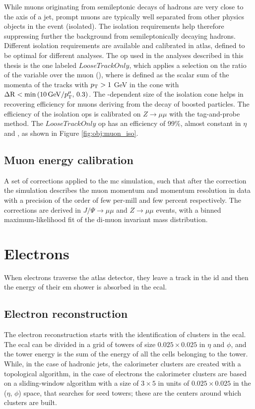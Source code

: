 While muons originating from semileptonic decays of hadrons are very close to the axis of a jet, prompt muons are typically well separated from other physics objects in the event (isolated). The isolation requirements help therefore suppressing further the background from semileptonically decaying hadrons. Different isolation requirements are available and calibrated in \gls{atlas}, defined to be optimal for different analyses. 
The \gls{op} used in the analyses described in this thesis is the one labeled $LooseTrackOnly$, which applies a selection on the ratio of the 
variable \ptvar over the muon \pt (\ptmu), where \ptvar is defined as the scalar sum of the momenta of the tracks with $p_{\rm T}>1$ GeV in the cone with 
$\Delta\mathrm{R} < \min \left(  10 \, \mathrm{GeV}/p_\mathrm{T}^\mu , \, 0.3\right) $. The \pt-dependent size of the isolation cone helps in recovering efficiency for muons deriving from the decay of boosted particles. The efficiency of the isolation \glspl{op} is calibrated on $Z\rightarrow \mu \mu$ with the tag-and-probe method. The $LooseTrackOnly$ \gls{op} has an efficiency of 99\%, almost constant in $\eta$ and \pt, as shown in Figure \ref{fig:obj:muon_iso}. 

\subsection{Muon energy calibration}
A set of corrections applied to the \gls{mc} simulation, such that after the correction the simulation describes the muon momentum and momentum resolution in data with a precision of the order of few per-mill and few percent respectively. 
The corrections are derived in $J/\Psi \rightarrow \mu \mu$ and $Z\rightarrow \mu \mu$ events, with a binned maximum-likelihood fit of the di-muon 
invariant mass distribution. 

\section{Electrons}

When electrons traverse the \gls{atlas} detector, they leave a track in the \gls{id} and then the energy of their \gls{em} shower is absorbed in the \gls{ecal}.

\subsection{Electron reconstruction}

The electron reconstruction \cite{ATLAS:2011lah,Aad:2014nim,ATLAS:2016iqc} starts with the identification of clusters in the \gls{ecal}. 
The \gls{ecal} can be divided in a grid of towers of size $0.025\times0.025$ in $\eta$ and $\phi$, and the tower energy is the sum of the 
energy of all the cells belonging to the tower. 
While, in the case of hadronic jets, the calorimeter clusters are created with a topological 
algorithm, in the case of electrons the calorimeter clusters are based on a sliding-window algorithm \cite{Lampl:2008zz} 
with a size of $3\times5$ in units of $0.025\times0.025$ in the ($\eta$, $\phi$) space, that searches for seed towers; these are the centers around which clusters are built.   


